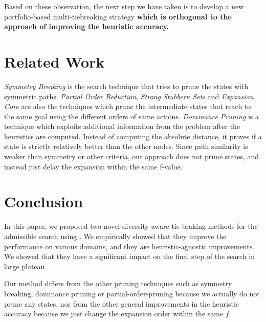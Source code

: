 Based on these observation, the next step we have taken is to develop a new
portfolio-based multi-tiebreaking strategy \textbf{which is orthogonal to
the approach of improving the heuristic accuracy.}




\section{Related Work}
\label{sec-4}

\emph{Symmetry Breaking} \cite{Fox1998,pochter2011exploiting,domshlak2013symmetry} is the search technique that tries to prune the states with symmetric paths. \emph{Partial Order Reduction}, \emph{Strong Stubbern Sets} and \emph{Expansion Core} are also the techniques which prune the intermediate states that reach to the same goal using the different orders of same actions. \emph{Dominance Pruning} \cite{erol1994} is a technique which exploits additional information from the problem after the heuristics are computed. Instead of computing the absolute distance, it  proves if a state is strictly relatively better than the other nodes. Since path similarity is weaker than symmetry or other criteria, our approach does not prune states, and instead just delay the expansion within the same f-value.

\section{Conclusion}

In this paper, we proposed two novel diversity-aware tie-braking methods for the admissible search using \astar. We empirically showed that they improve the performance on various domains, and they are heuristic-agnostic improvements. We showed that they have a significant impact on the final step of the search in large plateau.

Our method differs from the other pruning techniques such as symmetry breaking, dominance pruning or partial-order-pruning because we actually do not prune any states, nor from the other general improvements in the heuristic accuracy because we just change the expansion order within the same $f$.
